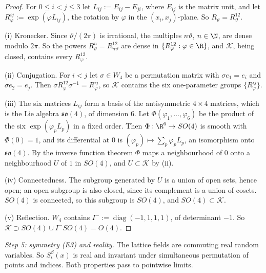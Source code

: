 \begin{proof}
For $0\le i<j\le3$ let $L_{ij}:=E_{ij}-E_{ji}$, where $E_{ij}$ is the matrix unit, and let $R^{ij}_\varphi:=\exp(\varphi L_{ij})$, the rotation by $\varphi$ in the $(x_i,x_j)$-plane. So $R_\vartheta=R^{12}_\vartheta$.

(i) Kronecker. Since $\vartheta/(2\pi)$ is irrational, the multiples $n\vartheta$, $n\in\N$, are dense modulo $2\pi$. So the powers $R_\vartheta^n=R^{12}_{n\vartheta}$ are dense in $\{R^{12}_\varphi:\varphi\in\R\}$, and $\mathcal K$, being closed, contains every $R^{12}_\varphi$.

(ii) Conjugation. For $i<j$ let $\sigma\in W_4$ be a permutation matrix with $\sigma e_1=e_i$ and $\sigma e_2=e_j$. Then $\sigma R^{12}_\varphi\sigma^{-1}=R^{ij}_\varphi$, so $\mathcal K$ contains the six one-parameter groups $\{R^{ij}_\varphi\}$.

(iii) The six matrices $L_{ij}$ form a basis of the antisymmetric $4\times4$ matrices, which is the Lie algebra $\mathfrak{so}(4)$, of dimension $6$. Let $\Phi(\varphi_1,\dots,\varphi_6)$ be the product of the six $\exp(\varphi_pL_p)$ in a fixed order. Then $\Phi:\R^6\to SO(4)$ is smooth with $\Phi(0)=1$, and its differential at $0$ is $(\varphi_p)\mapsto\sum_p\varphi_pL_p$, an isomorphism onto $\mathfrak{so}(4)$. By the inverse function theorem $\Phi$ maps a neighbourhood of $0$ onto a neighbourhood $U$ of $1$ in $SO(4)$, and $U\subset\mathcal K$ by (ii).

(iv) Connectedness. The subgroup generated by $U$ is a union of open sets, hence open; an open subgroup is also closed, since its complement is a union of cosets. $SO(4)$ is connected, so this subgroup is $SO(4)$, and $SO(4)\subset\mathcal K$.

(v) Reflection. $W_4$ contains $I^-:=\operatorname{diag}(-1,1,1,1)$, of determinant $-1$. So $\mathcal K\supset SO(4)\cup I^-SO(4)=O(4)$.
\end{proof}

\emph{Step 5: symmetry (E3) and reality.} The lattice fields are commuting real random variables. So $S^\beta_\iota(x)$ is real and invariant under simultaneous permutation of points and indices. Both properties pass to pointwise limits.

